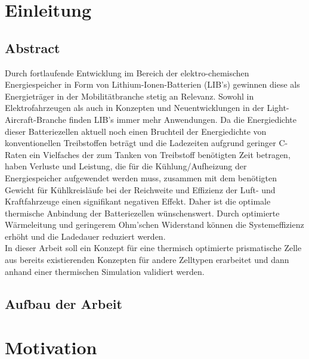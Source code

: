 \section{Einleitung}\label{sec:Einleitung}
%
\subsection{Abstract}\label{subsec:Abstract}

Durch fortlaufende Entwicklung im Bereich der elektro-chemischen Energiespeicher in Form von Lithium-Ionen-Batterien (LIB’s) gewinnen diese als Energieträger in der Mobilitätbranche stetig an Relevanz. Sowohl in Elektrofahrzeugen als auch in Konzepten und Neuentwicklungen in der Light-Aircraft-Branche finden LIB’s immer mehr Anwendungen. Da die Energiedichte dieser Batteriezellen aktuell noch einen Bruchteil der Energiedichte von konventionellen Treibstoffen beträgt und die Ladezeiten aufgrund geringer C-Raten ein Vielfaches der zum Tanken von Treibstoff benötigten Zeit betragen, haben Verluste und Leistung, die für die Kühlung/Aufheizung der Energiespeicher aufgewendet werden muss, zusammen mit dem benötigten Gewicht für Kühlkreisläufe bei der Reichweite und Effizienz der Luft- und Kraftfahrzeuge einen signifikant negativen Effekt. Daher ist die optimale thermische Anbindung der Batteriezellen wünschenswert. Durch optimierte Wärmeleitung und geringerem Ohm’schen Widerstand können die Systemeffizienz erhöht und die Ladedauer reduziert werden. \\
In dieser Arbeit soll ein Konzept für eine thermisch optimierte prismatische Zelle aus bereits existierenden Konzepten für andere Zelltypen erarbeitet und dann anhand einer thermischen Simulation validiert werden. \\

\subsection{Aufbau der Arbeit}\label{subsec:Aufbau}
 


\newpage
\section{Motivation}\label{sec:Motivation}

